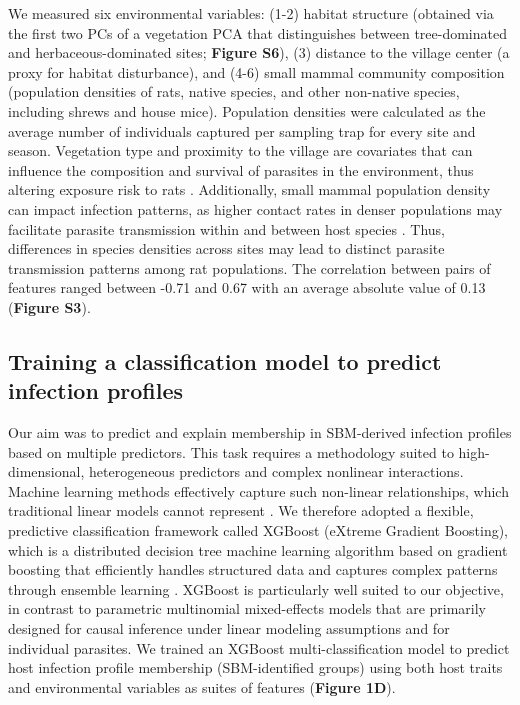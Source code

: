 \documentclass[oneside, a4paper, onecolumn, 11pt]{article}
\begin{document}
We measured six environmental variables: (1-2) habitat structure (obtained via the first two PCs of a vegetation PCA that distinguishes between tree-dominated and herbaceous-dominated sites; \textbf{Figure S6}), (3) distance to the village center (a proxy for habitat disturbance), and (4-6) small mammal community composition (population densities of rats, native species, and other non-native species, including shrews and house mice). Population densities were calculated as the average number of individuals captured per sampling trap for every site and season. Vegetation type and proximity to the village are covariates that can influence the composition and survival of parasites in the environment, thus altering exposure risk to rats \citep{Gottdenker2014-by,Patz2000-cg}. Additionally, small mammal population density can impact infection patterns, as higher contact rates in denser populations may facilitate parasite transmission within and between host species \citep{Begon2002-or,Gajewski2024-wb}. Thus, differences in species densities across sites may lead to distinct parasite transmission patterns among rat populations. The correlation between pairs of features ranged between -0.71 and 0.67 with an average absolute value of 0.13 (\textbf{Figure S3}).

\subsection*{Training a classification model to predict infection profiles}

Our aim was to predict and explain membership in SBM-derived infection profiles based on multiple predictors. This task requires a methodology suited to high-dimensional, heterogeneous predictors and complex nonlinear interactions. Machine learning methods effectively capture such non-linear relationships, which traditional linear models cannot represent \citep{Lundberg2020-ro,Manley2023-qx}. We therefore adopted a flexible, predictive classification framework called XGBoost (eXtreme Gradient Boosting), which is a distributed decision tree machine learning algorithm based on gradient boosting that efficiently handles structured data and captures complex patterns through ensemble learning \citep{Chen2016-ev}. XGBoost is particularly well suited to our objective, in contrast to parametric multinomial mixed-effects models that are primarily designed for causal inference under linear modeling assumptions and for individual parasites. We trained an XGBoost multi-classification model to predict host infection profile membership (SBM-identified groups) using both host traits and environmental variables as suites of features (\textbf{Figure 1D}). 
\end{document}
